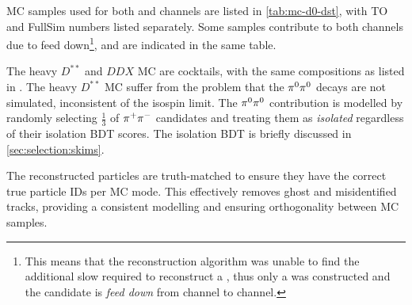 MC samples used for both \Dz and \Dstar channels are listed in
\cref{tab:mc-d0-dst}, with TO and FullSim numbers listed separately.
Some samples contribute to both channels due to feed down\footnote{
    This means that the reconstruction algorithm was unable to find the
    additional slow \pion required to reconstruct a \Dstar, thus only a
    \Dz was constructed and the candidate is \emph{feed down} from \Dstar
    channel to \Dz channel.
}, and are indicated in the same table.

The heavy $D^{**}$ and $DDX$ MC are cocktails, with the same compositions as
listed in \cite{LHCb-ANA-2020-056}.
The heavy $D^{**}$ MC suffer from the problem that the ${{\pi}^0} {{\pi}^0}$ decays
are not simulated, inconsistent of the isospin limit.
The ${{\pi}^0} {{\pi}^0}$ contribution is modelled by randomly selecting $\frac{1}{3}$ of
${{\pi}^+} {{\pi}^-}$ candidates and treating them as \emph{isolated} regardless of their
isolation BDT scores.
The isolation BDT is briefly discussed in \cref{sec:selection:skims}.

The reconstructed particles are truth-matched to ensure they have the correct
true particle IDs per MC mode.
This effectively removes ghost and misidentified tracks, providing a consistent
modelling and ensuring orthogonality between MC samples.
